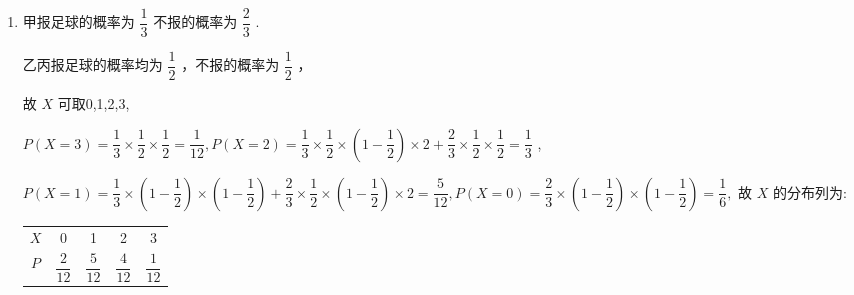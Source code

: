 \begin{enumerate}
\begin{enumerate}
\begin{jieda}
\begin{enumerate}
                \item 甲报足球的概率为 $\dfrac{1}{3}$ 不报的概率为 $\dfrac{2}{3}$ .
                
                乙丙报足球的概率均为 $\dfrac{1}{2}$ ，不报的概率为 $\dfrac{1}{2}$ ，
                
                故 $X$ 可取0,1,2,3,
                
                $P\left( {X = 3}\right)  = \dfrac{1}{3} \times  \dfrac{1}{2} \times  \dfrac{1}{2} = \dfrac{1}{12},P\left( {X = 2}\right)  = \dfrac{1}{3} \times  \dfrac{1}{2} \times  \left( {1 - \dfrac{1}{2}}\right)  \times  2 + \dfrac{2}{3} \times  \dfrac{1}{2} \times  \dfrac{1}{2} = \dfrac{1}{3}$ ,
                
                $P\left( {X = 1}\right)  = \dfrac{1}{3} \times  \left( {1 - \dfrac{1}{2}}\right)  \times  \left( {1 - \dfrac{1}{2}}\right)  + \dfrac{2}{3} \times  \dfrac{1}{2} \times  \left( {1 - \dfrac{1}{2}}\right)  \times  2 = \dfrac{5}{12},P\left( {X = 0}\right)  = \dfrac{2}{3} \times  \left( {1 - \dfrac{1}{2}}\right)  \times  \left( {1 - \dfrac{1}{2}}\right)  = \dfrac{1}{6},$ 故 $X$ 的分布列为:
                
                \begin{center}
                
                \begin{tabular}{|c|c|c|c|c|}
                \hline
                $X$ & 0 & 1 & 2 & 3 \\
                \cline{1-5}
                $P$ & $\dfrac{2}{12}$ & $\dfrac{5}{12}$ & $\dfrac{4}{12}$ & $\dfrac{1}{12}$ \\
                \cline{1-5}
                \hline
                \end{tabular}
                
                \end{center}
                

\end{enumerate}
\end{jieda}
\end{enumerate}
\end{enumerate}
